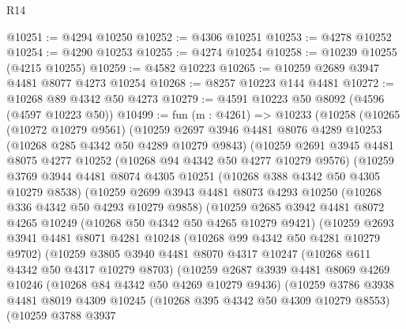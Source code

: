 \begin{lexlean}{R14}
\begin{coremodule}
@10251 := @4294 @10250
@10252 := @4306 @10251
@10253 := @4278 @10252
@10254 := @4290 @10253
@10255 := @4274 @10254
@10258 := @10239 @10255 (@4215 @10255)
@10259 := @4582 @10223
@10265 := @10259 @2689 @3947 @4481 @8077 @4273 @10254
@10268 := @8257 @10223 @144 @4481
@10272 := @10268 @89 @4342 @50 @4273
@10279 := @4591 @10223 @50 @8092 (@4596 (@4597 @10223 @50))
@10499 := fun (m : @4261) =>
  @10233
    (@10258
      (@10265
        (@10272 @10279 @9561)
        (@10259
          @2697
          @3946
          @4481
          @8076
          @4289
          @10253
          (@10268 @285 @4342 @50 @4289 @10279 @9843)
          (@10259
            @2691
            @3945
            @4481
            @8075
            @4277
            @10252
            (@10268 @94 @4342 @50 @4277 @10279 @9576)
            (@10259
              @3769
              @3944
              @4481
              @8074
              @4305
              @10251
              (@10268 @388 @4342 @50 @4305 @10279 @8538)
              (@10259
                @2699
                @3943
                @4481
                @8073
                @4293
                @10250
                (@10268 @336 @4342 @50 @4293 @10279 @9858)
                (@10259
                  @2685
                  @3942
                  @4481
                  @8072
                  @4265
                  @10249
                  (@10268 @50 @4342 @50 @4265 @10279 @9421)
                  (@10259
                    @2693
                    @3941
                    @4481
                    @8071
                    @4281
                    @10248
                    (@10268 @99 @4342 @50 @4281 @10279 @9702)
                    (@10259
                      @3805
                      @3940
                      @4481
                      @8070
                      @4317
                      @10247
                      (@10268 @611 @4342 @50 @4317 @10279 @8703)
                      (@10259
                        @2687
                        @3939
                        @4481
                        @8069
                        @4269
                        @10246
                        (@10268 @84 @4342 @50 @4269 @10279 @9436)
                        (@10259
                          @3786
                          @3938
                          @4481
                          @8019
                          @4309
                          @10245
                          (@10268 @395 @4342 @50 @4309 @10279 @8553)
                          (@10259
                            @3788
                            @3937

\end{coremodule}
\end{lexlean}

